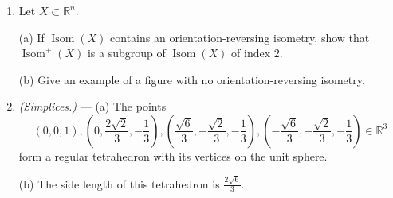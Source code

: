 \documentclass[leqno]{book}
\begin{document}
\begin{enumerate}
(d) Use this to classify all possible regular $4$-polytopes.  [There are six of them, discovered by Ludwig Schl\"afli in the 19th century.  You do not need to prove that each one really exists.]

\item Let $X\subset\mathbb R^n$.

(a) If $\operatorname{Isom}(X)$ contains an orientation-reversing isometry, show that $\operatorname{Isom}^+(X)$ is a subgroup of $\operatorname{Isom}(X)$ of index $2$.

(b) Give an example of a figure with no orientation-reversing isometry.

\item\emph{(Simplices.)} \---- (a) The points
$$\left(0,0,1\right),\left(0,\frac{2\sqrt 2}3,-\frac 13\right),\left(\frac{\sqrt 6}3,-\frac{\sqrt 2}3,-\frac 13\right),\left(-\frac{\sqrt 6}3,-\frac{\sqrt 2}3,-\frac 13\right)\in\mathbb R^3$$
form a regular tetrahedron with its vertices on the unit sphere.

(b) The side length of this tetrahedron is $\frac{2\sqrt 6}3$.


\end{enumerate}
\end{document}
